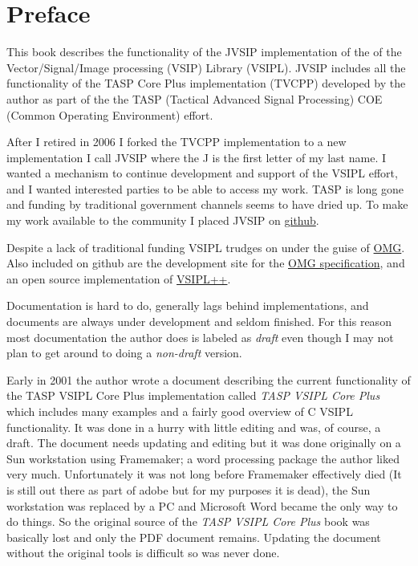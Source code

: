 \chapter{Preface}
This book describes the functionality of the JVSIP implementation of the of the Vector/Signal/Image processing (VSIP) Library (VSIPL).  JVSIP includes all the functionality of the TASP Core Plus implementation (TVCPP) developed by the author as part of the the TASP (Tactical Advanced Signal Processing) COE (Common Operating Environment) effort.  

After I retired in 2006 I forked the TVCPP implementation to a new implementation I call JVSIP where the J is the first letter of my last name.  I wanted a mechanism to continue development and support of the VSIPL effort, and I wanted interested parties to be able to access my work. TASP is long gone and funding by traditional government channels seems to have dried up. To make my work available to the community I placed JVSIP on  \href{https://github.com/rrjudd/jvsip?}{{github}}. 

Despite a lack of traditional funding VSIPL trudges on under the guise of \href{http://www.omg.org/spec/VSIPL/}{{OMG}}. Also included on github are the development site for the \href{https://github.com/vsip/specs/tree/master/vsipl}{{OMG specification}}, and an open source implementation of \href{https://github.com/openvsip/openvsip}{{VSIPL++}}.  

Documentation is hard to do, generally lags behind implementations, and documents are always under development and seldom finished.  For this reason most documentation the author does is labeled as \emph{draft} even though I may not plan to get around to doing a \emph{non-draft} version.

Early in 2001 the author wrote a document describing the current functionality of the TASP VSIPL Core Plus implementation called \emph{TASP VSIPL Core Plus} which includes many examples and a fairly good overview of C VSIPL functionality. It was done in a hurry with little editing and was, of course, a draft.  The document needs updating and editing but it was done originally on a Sun workstation using Framemaker; a word processing package the author liked very much. Unfortunately it was not long before Framemaker effectively died (It is still out there as part of adobe but for my purposes it is dead), the Sun workstation was replaced by a PC and Microsoft Word became the only way to do things. So the original source of the \emph{TASP VSIPL Core Plus} book was basically lost and only the PDF document remains.  Updating the document without the original tools is difficult so was never done.

